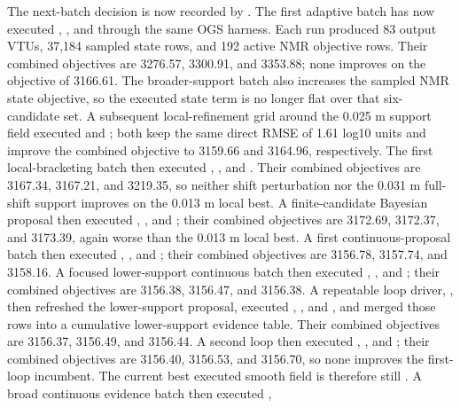 The next-batch decision is now recorded by
.  The first adaptive batch has now
executed , , and
 through the same OGS harness.  Each run produced 83 output VTUs,
37,184 sampled state rows, and 192 active NMR objective rows.  Their combined
objectives are 3276.57, 3300.91, and 3353.88; none improves on the
 objective of 3166.61.  The broader-support batch also increases
the sampled NMR state objective, so the executed state term is no longer flat over
that six-candidate set.  A subsequent local-refinement grid around the 0.025 m support
field executed  and ; both keep the same
direct RMSE of 1.61 log10 units and improve the combined objective to 3159.66 and
3164.96, respectively.  The first local-bracketing batch then executed
, , and
.  Their combined objectives are 3167.34, 3167.21, and 3219.35,
so neither shift perturbation nor the 0.031 m full-shift support improves on the
0.013 m local best.  A finite-candidate Bayesian proposal then executed
, , and
; their combined objectives are 3172.69, 3172.37,
and 3173.39, again worse than the 0.013 m local best.  A first continuous-proposal
batch then executed , , and
; their combined objectives are 3156.78, 3157.74,
and 3158.16.  A focused lower-support continuous batch then executed
, , and
; their combined objectives are 3156.38, 3156.47,
and 3156.38.  A repeatable loop driver,
, then refreshed the lower-support proposal,
executed ,
, and , and merged
those rows into a cumulative lower-support evidence table.  Their combined objectives
are 3156.37, 3156.49, and 3156.44.  A second loop then executed
, , and
; their combined objectives are 3156.40, 3156.53,
and 3156.70, so none improves the first-loop incumbent.  The current best executed
smooth field is therefore still .  A broad
continuous evidence batch then executed ,
